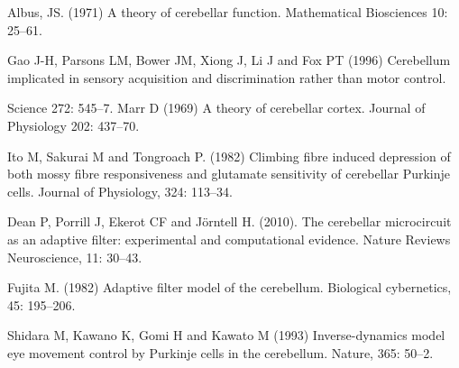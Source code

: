 \documentclass[11pt,a4paper]{scrartcl}
\begin{document}
\begin{thebibliography}{10}

Albus, JS. (1971) A theory of cerebellar function. 
\newblock Mathematical Biosciences 10: 25--61.

Gao J-H, Parsons LM, Bower JM, Xiong J, Li J and Fox PT (1996) Cerebellum implicated in sensory acquisition and discrimination rather than motor control.

\newblock Science 272: 545--7. 
Marr D (1969) A theory of cerebellar cortex.
\newblock Journal of Physiology 202: 437--70.

Ito M, Sakurai M and Tongroach P. (1982) Climbing fibre induced depression of both mossy fibre responsiveness and glutamate sensitivity of cerebellar Purkinje cells. 
\newblock Journal of Physiology, 324: 113--34.

Dean P, Porrill J, Ekerot CF and J\"{o}rntell H. (2010). The cerebellar microcircuit as an adaptive filter: experimental and computational evidence. 
\newblock Nature Reviews Neuroscience, 11: 30--43.

Fujita M. (1982) Adaptive filter model of the cerebellum. 
\newblock Biological cybernetics, 45: 195--206.


Shidara M, Kawano K, Gomi H and Kawato M (1993) Inverse-dynamics model eye movement control by Purkinje cells in the cerebellum.
\newblock Nature, 365: 50--2.
\end{thebibliography}
\end{document}
